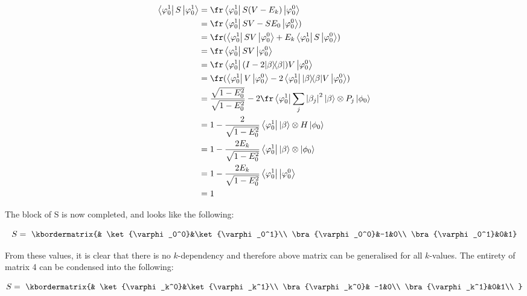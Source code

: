 \begin{align} \begin{split}
\bra{\varphi_0^1}S\ket{\varphi_0^1} &= \fr \bra{\varphi_0^1} S(V-E_k) \ket{\varphi_0^0} \\
&= \fr \bra{\varphi_0^1} SV - S E_0 \ket{\varphi_0^0})\\
&= \fr ( \bra{\varphi_0^1} SV \ket{\varphi_0^0} + E_k \bra{\varphi_0^1} S \ket{\varphi_0^0})\\
&= \fr \bra{\varphi_0^1} SV \ket{\varphi_0^0} \\
&= \fr \bra{\varphi_0^1} (I - 2 \kb \beta \beta) V \ket{\varphi_0^0}\\
&= \fr ( \bra{\varphi_0^1} V \ket{\varphi_0^0} - 2  \bra{\varphi_0^1} \kb \beta \beta V \ket{\varphi_0^0})\\
&= \frac{\sqrt{1-E_0^2}}{\sqrt{1-E_0^2}} - 2 \fr \bra{\varphi_0^1} \sum_j \abs{\beta_j}^2 \ket{\beta} \otimes P_j \ket{\phi_0}\\
&= 1 - \frac{2}{\sqrt{1-E_0^2}} \bra{\varphi_0^1} \ket{\beta} \otimes H \ket{\phi_0}\\
&= 1 - \frac{2E_k}{\sqrt{1-E_0^2}} \bra{\varphi_0^1} \ket{\beta} \otimes \ket{\phi_0}\\
&= 1 - \frac{2E_k}{\sqrt{1-E_0^2}} \bra{\varphi_0^1} \ket{\varphi_0^0}\\
&= 1
\end{split} \end{align}



The block of S is now completed, and looks like the following:

\begin{equation}
S = \
\kbordermatrix{& \ket{\varphi_0^0}&\ket{\varphi_0^1}\\
\bra{\varphi_0^0}&-1&0\\
\bra{\varphi_0^1}&0&1}
\end{equation}


From these values, it is clear that there is no $k$-dependency and therefore above matrix can be generalised for all $k$-values. The entirety of matrix 4 can be condensed into the following:


\begin{equation}
S = \
\kbordermatrix{& \ket{\varphi_k^0}&\ket{\varphi_k^1}\\
\bra{\varphi_k^0}& -1&0\\
\bra{\varphi_k^1}&0&1\\
}
\end{equation}


